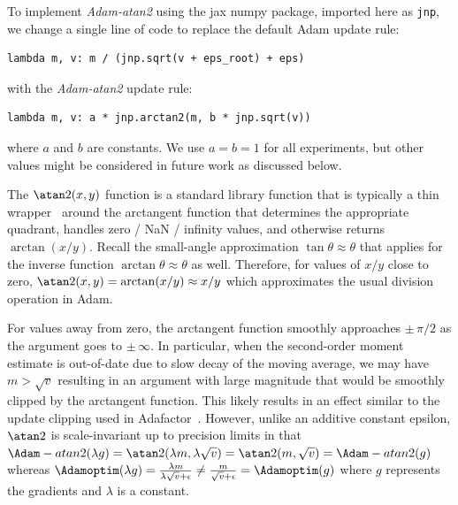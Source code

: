 To implement \emph{Adam-atan2} using the jax numpy package, imported here as \Verb +jnp+, we change a single line of code to replace the default Adam update rule:
\begin{center}
\begin{BVerbatim}[vspace=0pt,baselinestretch=0.0]
lambda m, v: m / (jnp.sqrt(v + eps_root) + eps)
\end{BVerbatim}
\end{center}
with the \emph{Adam-atan2} update rule:
\begin{center}
\begin{BVerbatim}[vspace=0pt,baselinestretch=0.0]
lambda m, v: a * jnp.arctan2(m, b * jnp.sqrt(v))
\end{BVerbatim}
\end{center}
where $a$ and $b$ are constants. We use $a = b = 1$ for all experiments, but other values might be considered in future work as discussed below.


The $\atan2(x,y)$ function is a standard library function that is typically a thin wrapper~\citep{numpy_atan2} around the arctangent function that determines the appropriate quadrant, handles zero / NaN / infinity values, and otherwise returns $\arctan(x/y)$. Recall the small-angle approximation $\tan \theta \approx \theta$ that applies for the inverse function $\arctan \theta \approx \theta$ as well. Therefore, for values of $x/y$ close to zero, $\atan2(x, y) = \arctan(x/y) \approx x/y$ which approximates the usual division operation in Adam.

For values away from zero, the arctangent function smoothly approaches $\pm\,\pi/2$ as the argument goes to $\pm\,\infty$. In particular, when the second-order moment estimate is out-of-date due to slow decay of the moving average, we may have $m > \sqrt{v}$ resulting in an argument with large magnitude that would be smoothly clipped by the arctangent function. This likely results in an effect similar to the update clipping used in Adafactor~\citep{shazeer2018adafactor}. However, unlike an additive constant epsilon, $\atan2$ is scale-invariant up to precision limits in that $\Adam-atan2(\lambda g) = \atan2(\lambda m, \lambda \sqrt{v}) = \atan2(m, \sqrt{v}) = \Adam-atan2(g)$ whereas $\Adamoptim(\lambda g) = \frac{\lambda m}{\lambda \sqrt{v} + \epsilon} \neq \frac{m}{\sqrt{v} + \epsilon} = \Adamoptim(g)$ where $g$ represents the gradients and $\lambda$ is a constant.

